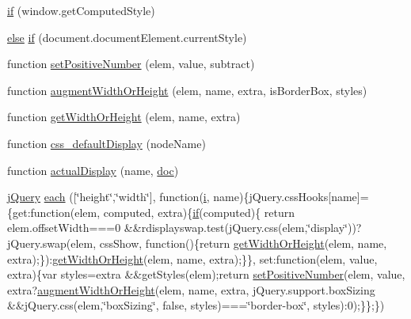 \begin{DoxyCompactItemize}
\item 
\hyperlink{_scripts_2jquery-1_810_82_8js_add3620f254b483a46b557fde577ecbf7}{if} (window.\+get\+Computed\+Style)
\item 
\hyperlink{_scripts_2jquery_8validate_8js_a0544c3fe466e421738dae463968b70ba}{else} \hyperlink{_scripts_2jquery-1_810_82_8js_ac118b48e1947a1d7c85fefbdad49502e}{if} (document.\+document\+Element.\+current\+Style)
\item 
function \hyperlink{_scripts_2jquery-1_810_82_8js_a049182834e8b4b2d7485cd919ed272d7}{set\+Positive\+Number} (elem, value, subtract)
\item 
function \hyperlink{_scripts_2jquery-1_810_82_8js_aacaac1f0b5ea53030522e6f5b227ce51}{augment\+Width\+Or\+Height} (elem, name, extra, is\+Border\+Box, styles)
\item 
function \hyperlink{_scripts_2jquery-1_810_82_8js_a6520fbbeac78eeb0f519393470dc873b}{get\+Width\+Or\+Height} (elem, name, extra)
\item 
function \hyperlink{_scripts_2jquery-1_810_82_8js_a90f91be23732240774f2a323d500c78a}{css\+\_\+default\+Display} (node\+Name)
\item 
function \hyperlink{_scripts_2jquery-1_810_82_8js_a88bc5a80e40ccc594ece17ae5772d5d3}{actual\+Display} (name, \hyperlink{_scripts_2respond_8js_a8375eceb3a4b59a36700e7fc468e8983}{doc})
\item 
\hyperlink{_scripts_2jquery-1_810_82_8js_a41c2e1bff4a6b292938143764e31d789}{j\+Query} \hyperlink{_scripts_2jquery-1_810_82_8js_af7620627e2f905064d3dff5102ed804b}{each} (\mbox{[}\char`\"{}height\char`\"{},\char`\"{}width\char`\"{}\mbox{]}, function(\hyperlink{_scripts_2respond_8min_8js_a5e25b1d1bed9ab5f3174b76d6a722180}{i}, name)\{j\+Query.\+css\+Hooks\mbox{[}name\mbox{]}=\{get\+:function(elem, computed, extra)\{\hyperlink{_scripts_2respond_8min_8js_a93851d60dd037a83509a1757b9ee7b66}{if}(computed)\{   return elem.\+offset\+Width===0 \&\&rdisplayswap.\+test(j\+Query.\+css(elem,\char`\"{}display\char`\"{}))?j\+Query.\+swap(elem, css\+Show, function()\{return \hyperlink{_scripts_2jquery-1_810_82_8js_a6520fbbeac78eeb0f519393470dc873b}{get\+Width\+Or\+Height}(elem, name, extra);\})\+:\hyperlink{_scripts_2jquery-1_810_82_8js_a6520fbbeac78eeb0f519393470dc873b}{get\+Width\+Or\+Height}(elem, name, extra);\}\}, set\+:function(elem, value, extra)\{var styles=extra \&\&get\+Styles(elem);return \hyperlink{_scripts_2jquery-1_810_82_8js_a049182834e8b4b2d7485cd919ed272d7}{set\+Positive\+Number}(elem, value, extra?\hyperlink{_scripts_2jquery-1_810_82_8js_aacaac1f0b5ea53030522e6f5b227ce51}{augment\+Width\+Or\+Height}(elem, name, extra, j\+Query.\+support.\+box\+Sizing \&\&j\+Query.\+css(elem,\char`\"{}box\+Sizing\char`\"{}, false, styles)===\char`\"{}border-\/box\char`\"{}, styles)\+:0);\}\};\})

\end{DoxyCompactItemize}
